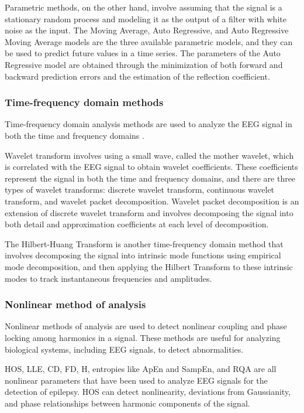 Parametric methods, on the other hand, involve assuming that the signal is a stationary random process and modeling it as the output of a filter with white noise as the input. 
The Moving Average, Auto Regressive, and Auto Regressive Moving Average models are the three available parametric models, and they can be used to predict future values in a time series. The parameters of the Auto Regressive model are obtained through the minimization of both forward and backward prediction errors and the estimation of the reflection coefficient.

\subsubsection{Time-frequency domain methods}
Time-frequency domain analysis methods are used to analyze the \gls{EEG} signal in both the time and frequency domains \cite{acharya_automated_2013}.

Wavelet transform involves using a small wave, called the mother wavelet, which is correlated with the \gls{EEG} signal to obtain wavelet coefficients. These coefficients represent the signal in both the time and frequency domains, and there are three types of wavelet transforms: discrete wavelet transform, continuous wavelet transform, and wavelet packet decomposition. 
Wavelet packet decomposition is an extension of discrete wavelet transform and involves decomposing the signal into both detail and approximation coefficients at each level of decomposition. 

The Hilbert-Huang Transform is another time-frequency domain method that involves decomposing the signal into intrinsic mode functions using empirical mode decomposition, and then applying the Hilbert Transform to these intrinsic modes to track instantaneous frequencies and amplitudes.

\subsubsection{Nonlinear method of analysis}
Nonlinear methods of analysis are used to detect nonlinear coupling and phase locking among harmonics in a signal. 
These methods are useful for analyzing biological systems, including EEG signals, to detect abnormalities. 

\gls{HOS}, \gls{LLE}, \gls{CD}, \gls{FD}, \gls{H}, entropies like \gls{ApEn} and \gls{SampEn}, and \gls{RQA} are all nonlinear parameters that have been used to analyze EEG signals for the detection of epilepsy. \gls{HOS} can detect nonlinearity, deviations from Gaussianity, and phase relationships between harmonic components of the signal. 

